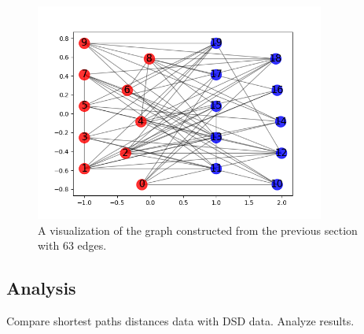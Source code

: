 \documentclass[12pt]{report}
\begin{document}
\begin{figure}[!ht]
\centering
\includegraphics[width=0.85\textwidth]{Simulation_Bipartite_Example_1.png}
\caption{A visualization of the graph constructed from the previous section with 63 edges.}
\label{fig:bip_ex_1}
\end{figure}


\subsection{Analysis}
\noindent
Compare shortest paths distances data with DSD data. Analyze results.
\end{document}

